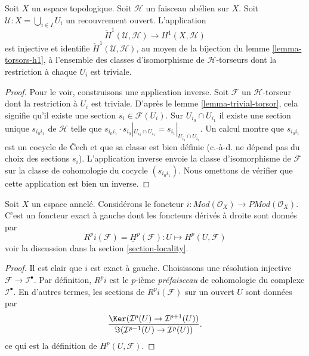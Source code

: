 \begin{lemma}

\label{lemma-cech-h1}
Soit $X$ un espace topologique. Soit $\mathcal{H}$ un faisceau abélien sur $X$. Soit $\mathcal{U} : X = \bigcup_{i \in I} U_i$ un recouvrement ouvert. L'application $$
\check{H}^1(\mathcal{U}, \mathcal{H}) \longrightarrow H^1(X, \mathcal{H})
$$ est injective et identifie $\check{H}^1(\mathcal{U}, \mathcal{H})$, au moyen de la bijection du lemme \ref{lemma-torsors-h1}, à l'ensemble des classes d'isomorphisme de $\mathcal{H}$-torseurs dont la restriction à chaque $U_i$ est triviale.
\end{lemma}

\begin{proof}

Pour le voir, construisons une application inverse. Soit $\mathcal{F}$ un
$\mathcal{H}$-torseur dont la restriction à $U_i$ est triviale. D'après le lemme \ref{lemma-trivial-torsor}, cela signifie qu'il existe une section $s_i \in \mathcal{F}(U_i)$. Sur $U_{i_0} \cap U_{i_1}$
il existe une section unique $s_{i_0i_1}$ de $\mathcal{H}$ telle que
$s_{i_0i_1} \cdot s_{i_0}|_{U_{i_0} \cap U_{i_1}} =
s_{i_1}|_{U_{i_0} \cap U_{i_1}}$. Un calcul montre que $s_{i_0i_1}$ est un cocycle de {\v C}ech et que sa classe est bien définie (c.-à-d. ne dépend pas du choix des sections $s_i$). L'application inverse envoie la classe d'isomorphisme de $\mathcal{F}$ sur la classe de cohomologie du cocycle $(s_{i_0i_1})$. Nous omettons de vérifier que cette application est bien un inverse.

\end{proof}

\begin{lemma}

\label{lemma-include}
Soit $X$ un espace annelé. Considérons le foncteur $i : \textit{Mod}(\mathcal{O}_X) \to \textit{PMod}(\mathcal{O}_X)$. C'est un foncteur exact à gauche dont les foncteurs dérivés à droite sont donnés par $$
R^pi(\mathcal{F}) = \underline{H}^p(\mathcal{F}) :
U \longmapsto H^p(U, \mathcal{F})
$$ voir la discussion dans la section \ref{section-locality}.
\end{lemma}

\begin{proof}
Il est clair que $i$ est exact à gauche. Choisissons une résolution injective $\mathcal{F} \to \mathcal{I}^\bullet$. Par définition, $R^pi$ est le $p$-ième {\it préfaisceau} de cohomologie du complexe $\mathcal{I}^\bullet$. En d'autres termes, les sections de $R^pi(\mathcal{F})$ sur un ouvert $U$ sont données par $$
\frac{\Ker(\mathcal{I}^p(U) \to \mathcal{I}^{p + 1}(U))}
{\Im(\mathcal{I}^{p - 1}(U) \to \mathcal{I}^p(U))}.
$$ ce qui est la définition de $H^p(U, \mathcal{F})$.
\end{proof}


